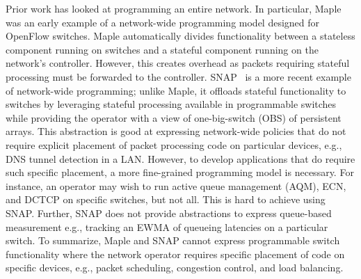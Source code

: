 Prior work has looked at programming an entire
network. In particular, Maple~\cite{maple} was an early example of a
network-wide programming model designed for OpenFlow switches. Maple
automatically divides functionality between a stateless component running on
switches and a stateful component running on the network's controller. However,
this creates overhead as packets requiring stateful processing
must be forwarded to the controller. SNAP~\cite{snap} is a more recent example of network-wide programming; unlike
Maple, it offloads stateful functionality to switches by
leveraging stateful processing available in programmable switches while providing the operator with a view of one-big-switch (OBS) of persistent arrays. 
This abstraction is good at expressing network-wide policies that do not require explicit placement of packet processing code on particular devices, e.g., DNS tunnel detection in a LAN. 
However, to develop applications that do require such specific placement, a more fine-grained programming model is necessary. For instance, an operator may wish to run active queue management (AQM), ECN, and DCTCP on specific switches, but not all. This is hard to achieve using SNAP. Further, SNAP does not provide abstractions to express queue-based measurement e.g., tracking an EWMA of queueing latencies on a particular switch. %
To summarize, Maple and SNAP cannot express programmable switch functionality where the network operator requires specific placement of code on specific devices, e.g., packet scheduling, congestion control, and load balancing. %

